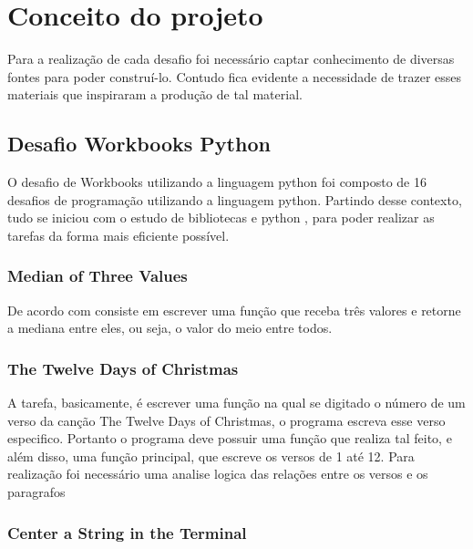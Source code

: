 \chapter{Conceito do projeto}
\label{chap:fundteor}

Para a realização de cada desafio foi necessário captar conhecimento de diversas fontes para poder construí-lo. Contudo fica evidente a necessidade de trazer esses materiais que inspiraram a produção de tal material.


\section{Desafio Workbooks Python}

O desafio de Workbooks utilizando a linguagem python foi composto de 16 desafios de programação utilizando a linguagem python. Partindo desse contexto, tudo se iniciou com o estudo de bibliotecas e python \cite{CursoPyt77:online}, para poder realizar as tarefas da forma mais eficiente possível. 

\subsection{Median of Three Values}

De acordo com  consiste em escrever uma função que receba três valores e retorne a mediana entre eles, ou seja, o valor do meio entre todos.

\subsection{The Twelve Days of Christmas}

A tarefa, basicamente, é escrever uma função na qual se digitado o número de um verso da canção The Twelve Days of Christmas, o programa escreva esse verso especifico. Portanto o programa deve possuir uma função que realiza tal feito, e além disso, uma função principal, que escreve os versos de 1 até 12. Para realização foi necessário uma analise logica das relações entre os versos e os paragrafos 

\subsection{Center a String in the Terminal}

